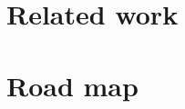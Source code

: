 \documentclass{article}
\begin{document}
\section{Related work}

\section{Road map}



\end{document}
